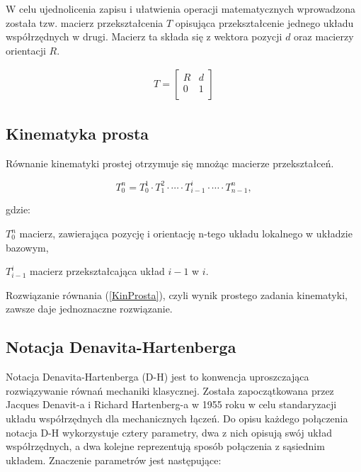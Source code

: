 W celu ujednolicenia zapisu i ułatwienia operacji matematycznych wprowadzona została tzw. macierz przekształcenia $T$ opisująca przekształcenie jednego układu współrzędnych w drugi. Macierz ta składa się z wektora pozycji $d$ oraz macierzy orientacji $R$.

 \begin{eqnarray}
 \label{MacierzPrzeksztalcenia}
 T
 =
 \begin{bmatrix}
R &
d \\
0 &
1 \\
 \end{bmatrix}
 \end{eqnarray}
 
 \subsection{Kinematyka prosta}
 
 Równanie kinematyki prostej otrzymuje się mnożąc macierze przekształceń. 
 
 \begin{equation} \label{KinProsta}
 T_{0}^{n} = T_{0}^{1} \cdot T_{1}^{2} \cdot \cdots \cdot T_{i-1}^{i} \cdot \cdots \cdot T_{n-1}^{n} ,
 \end{equation}
 
 gdzie:
 
 \begin{eqwhere}[2cm]
 	\item[$T^{n}_{0}$] macierz, zawierająca pozycję i orientację n-tego układu lokalnego w układzie bazowym,
 	 \end{eqwhere}
  \begin{eqwhere}[2.2cm]
 	\item[$T^{i}_{i-1}$] macierz przekształcająca układ $i-1$ w $i$.
 \end{eqwhere}

Rozwiązanie równania (\ref{KinProsta}), czyli wynik prostego zadania kinematyki, zawsze daje jednoznaczne rozwiązanie.  
 
 
 \subsection{Notacja Denavita-Hartenberga}
 
 Notacja Denavita-Hartenberga (D-H) jest to konwencja uproszczająca rozwiązywanie równań mechaniki klasycznej. Została zapoczątkowana przez Jacques Denavit-a i Richard Hartenberg-a w 1955 roku w celu standaryzacji układu współrzędnych dla mechanicznych łączeń. Do opisu każdego połączenia notacja D-H wykorzystuje cztery parametry, dwa z nich opisują swój układ współrzędnych, a dwa kolejne reprezentują sposób połączenia z sąsiednim układem. Znaczenie parametrów jest następujące:
 
